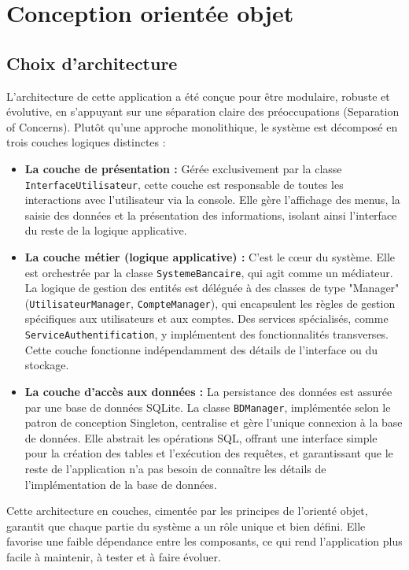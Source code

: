 \chapter{Conception orientée objet}

\section{Choix d’architecture}
L'architecture de cette application a été conçue pour être modulaire, robuste et évolutive, en s'appuyant sur une séparation claire des préoccupations (Separation of Concerns). Plutôt qu'une approche monolithique, le système est décomposé en trois couches logiques distinctes :

\begin{itemize}
  \item \textbf{La couche de présentation :} Gérée exclusivement par la classe \texttt{InterfaceUtilisateur}, cette couche est responsable de toutes les interactions avec l'utilisateur via la console. Elle gère l'affichage des menus, la saisie des données et la présentation des informations, isolant ainsi l'interface du reste de la logique applicative.

  \item \textbf{La couche métier (logique applicative) :} C'est le cœur du système. Elle est orchestrée par la classe \texttt{SystemeBancaire}, qui agit comme un médiateur. La logique de gestion des entités est déléguée à des classes de type "Manager" (\texttt{UtilisateurManager}, \texttt{CompteManager}), qui encapsulent les règles de gestion spécifiques aux utilisateurs et aux comptes. Des services spécialisés, comme \texttt{ServiceAuthentification}, y implémentent des fonctionnalités transverses. Cette couche fonctionne indépendamment des détails de l'interface ou du stockage.

  \item \textbf{La couche d’accès aux données :} La persistance des données est assurée par une base de données SQLite. La classe \texttt{BDManager}, implémentée selon le patron de conception Singleton, centralise et gère l'unique connexion à la base de données. Elle abstrait les opérations SQL, offrant une interface simple pour la création des tables et l'exécution des requêtes, et garantissant que le reste de l'application n'a pas besoin de connaître les détails de l'implémentation de la base de données.
\end{itemize}

Cette architecture en couches, cimentée par les principes de l'orienté objet, garantit que chaque partie du système a un rôle unique et bien défini. Elle favorise une faible dépendance entre les composants, ce qui rend l'application plus facile à maintenir, à tester et à faire évoluer.


